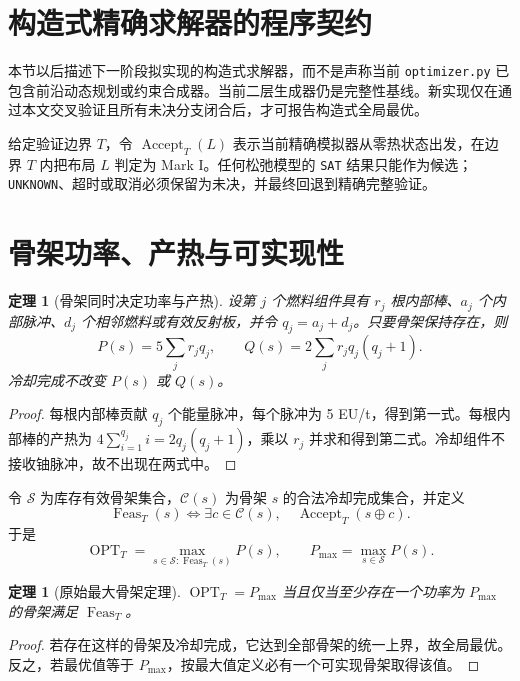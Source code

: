 \documentclass[UTF8,11pt]{ctexart}
\newtheorem{theorem}[definition]{定理}
\begin{document}
\section{构造式精确求解器的程序契约}

本节以后描述下一阶段拟实现的构造式求解器，而不是声称当前 \texttt{optimizer.py} 已包含前沿动态规划或约束合成器。当前二层生成器仍是完整性基线。新实现仅在通过本文交叉验证且所有未决分支闭合后，才可报告构造式全局最优。

给定验证边界 $T$，令 $\operatorname{Accept}_T(L)$ 表示当前精确模拟器从零热状态出发，在边界 $T$ 内把布局 $L$ 判定为 Mark I。任何松弛模型的 \texttt{SAT} 结果只能作为候选；\texttt{UNKNOWN}、超时或取消必须保留为未决，并最终回退到精确完整验证。

\section{骨架功率、产热与可实现性}

\begin{theorem}[骨架同时决定功率与产热]
设第 $j$ 个燃料组件具有 $r_j$ 根内部棒、$a_j$ 个内部脉冲、$d_j$ 个相邻燃料或有效反射板，并令 $q_j=a_j+d_j$。只要骨架保持存在，则
\[
P(s)=5\sum_j r_jq_j,
\qquad
Q(s)=2\sum_j r_jq_j(q_j+1).
\]
冷却完成不改变 $P(s)$ 或 $Q(s)$。
\end{theorem}

\begin{proof}
每根内部棒贡献 $q_j$ 个能量脉冲，每个脉冲为 5 EU/t，得到第一式。每根内部棒的产热为 $4\sum_{i=1}^{q_j}i=2q_j(q_j+1)$，乘以 $r_j$ 并求和得到第二式。冷却组件不接收铀脉冲，故不出现在两式中。
\end{proof}

令 $\mathcal S$ 为库存有效骨架集合，$\mathcal C(s)$ 为骨架 $s$ 的合法冷却完成集合，并定义
\[
\operatorname{Feas}_T(s)
\iff
\exists c\in\mathcal C(s),\quad
\operatorname{Accept}_T(s\oplus c).
\]
于是
\[
\operatorname{OPT}_T=
\max_{s\in\mathcal S:\operatorname{Feas}_T(s)}P(s),
\qquad
P_{\max}=\max_{s\in\mathcal S}P(s).
\]

\begin{theorem}[原始最大骨架定理]
$\operatorname{OPT}_T=P_{\max}$ 当且仅当至少存在一个功率为 $P_{\max}$ 的骨架满足 $\operatorname{Feas}_T$。
\end{theorem}

\begin{proof}
若存在这样的骨架及冷却完成，它达到全部骨架的统一上界，故全局最优。反之，若最优值等于 $P_{\max}$，按最大值定义必有一个可实现骨架取得该值。
\end{proof}
\end{document}
